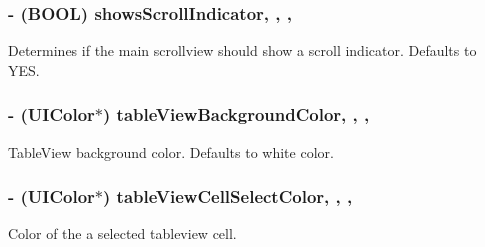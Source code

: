 \subsubsection[{shows\+Scroll\+Indicator}]{\setlength{\rightskip}{0pt plus 5cm}-\/ (B\+O\+O\+L) shows\+Scroll\+Indicator\hspace{0.3cm}{\ttfamily [read]}, {\ttfamily [write]}, {\ttfamily [nonatomic]}, {\ttfamily [assign]}}\label{interface_r_f_about_view_controller_a84a5073683af56bf6023d46b63f45ef5}
Determines if the main scrollview should show a scroll indicator. Defaults to Y\+E\+S. \hypertarget{interface_r_f_about_view_controller_a96944770e86701d5209191b378157f3c}{}
\subsubsection[{table\+View\+Background\+Color}]{\setlength{\rightskip}{0pt plus 5cm}-\/ (U\+I\+Color$\ast$) table\+View\+Background\+Color\hspace{0.3cm}{\ttfamily [read]}, {\ttfamily [write]}, {\ttfamily [nonatomic]}, {\ttfamily [strong]}}\label{interface_r_f_about_view_controller_a96944770e86701d5209191b378157f3c}
Table\+View background color. Defaults to white color. \hypertarget{interface_r_f_about_view_controller_a9a4efaabc35802118760a5f621d1bb45}{}
\subsubsection[{table\+View\+Cell\+Select\+Color}]{\setlength{\rightskip}{0pt plus 5cm}-\/ (U\+I\+Color$\ast$) table\+View\+Cell\+Select\+Color\hspace{0.3cm}{\ttfamily [read]}, {\ttfamily [write]}, {\ttfamily [nonatomic]}, {\ttfamily [strong]}}\label{interface_r_f_about_view_controller_a9a4efaabc35802118760a5f621d1bb45}
Color of the a selected tableview cell. \hypertarget{interface_r_f_about_view_controller_a4a3eebb1c1bcdbf534cba553490f5693}{}
